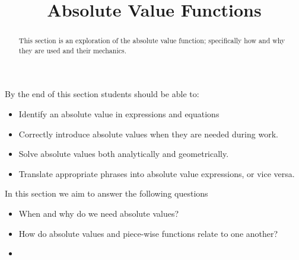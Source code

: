 \documentclass{ximera}
\title{Absolute Value Functions}
\begin{document}
\begin{abstract}
    This section is an exploration of the absolute value function; specifically how and why they are used and their mechanics.
\end{abstract}
\maketitle
By the end of this section students should be able to:

\begin{itemize}
    \item Identify an absolute value in expressions and equations
    \item Correctly introduce absolute values when they are needed during work.
    \item Solve absolute values both analytically and geometrically.
    \item Translate appropriate phrases into absolute value expressions, or vice versa.
\end{itemize}


In this section we aim to answer the following questions

\begin{itemize}
    \item When and why do we need absolute values?
    \item How do absolute values and piece-wise functions relate to one another?
    \item 
\end{itemize}
\end{document}

